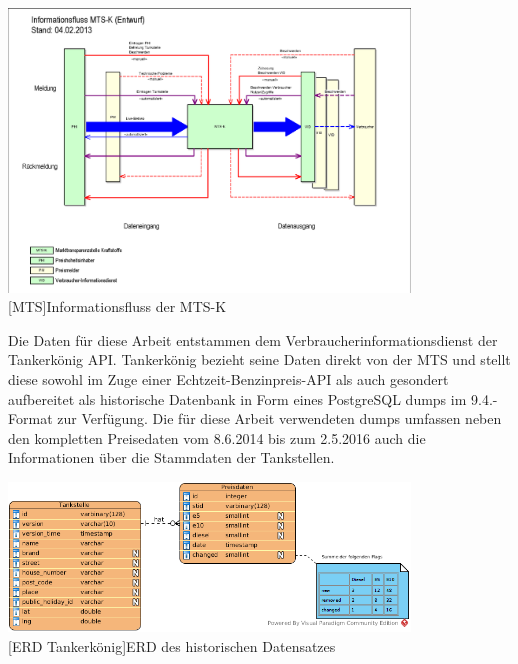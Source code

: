 \documentclass[12pt,a4paper,bibliography=totocnumbered,listof=totocnumbered]{scrartcl}
\begin{document}
\begin{center}
	\includegraphics[width=0.8\textwidth]{Bilder/Informationsfluss-MTS.png}\\
	[MTS]{Informationsfluss der MTS-K\cite{IMTSK}}
	\label{fig:MTS-K}
\end{center} 

Die Daten für diese Arbeit entstammen dem Verbraucherinformationsdienst der Tankerkönig API. Tankerkönig bezieht seine Daten direkt von der MTS  und stellt diese sowohl im Zuge einer Echtzeit-Benzinpreis-API als auch gesondert aufbereitet als historische Datenbank in Form eines PostgreSQL dumps im 9.4.-Format zur Verfügung. Die für diese Arbeit verwendeten dumps umfassen neben den kompletten Preisedaten vom 8.6.2014 bis zum 2.5.2016 auch die Informationen über die Stammdaten der Tankstellen.\cite{TkAPI} 

\begin{center}
	\includegraphics[width=0.8\textwidth]{Bilder/pricing_data.png}\\
	[ERD Tankerkönig]{ERD des historischen Datensatzes}
	\label{fig:ERD-T}
\end{center}

\end{document}
